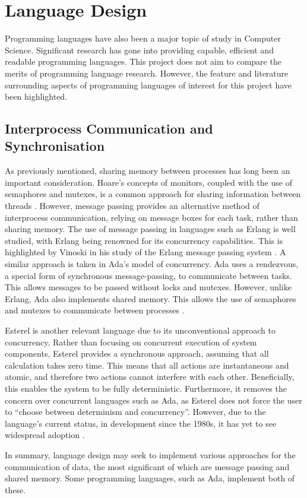 \section{Language Design} 
Programming languages have also been a major topic of study in Computer 
Science. Significant research has gone into providing
capable, efficient and readable programming languages. This project
does not aim to compare the merits of programming language research. However, the
feature and literature surrounding aspects of programming languages of
interest for this project have been highlighted. 

\subsection{Interprocess Communication and Synchronisation} %
As previously mentioned, sharing memory between processes has long been an
important consideration. Hoare's concepts of monitors, coupled with the use of semaphores
and mutexes, is a common approach for sharing information between threads
\cite{Hoare:1974:MOS:355620.361161}.  However, message passing provides an
alternative method of interprocess communication, relying on message boxes for
each task, rather than sharing memory. The use of
message passing in languages such as Erlang is well studied, with
Erlang being renowned for its concurrency capabilities. This is highlighted by
Vinoski in his study of the Erlang message passing system \cite{6216341}. 
A similar approach is taken in Ada's model of
concurrency. Ada uses a rendezvous, a special form of synchronous
message-passing, to communicate between tasks. This allows
messages to be passed without locks and mutexes. However, unlike
Erlang, Ada also implements shared memory. This allows the use of semaphores
and mutexes to communicate between processes
\cite{burns1998concurrency}.  
\par\bigskip\noindent
Esterel is another relevant language due to its unconventional approach to 
concurrency. Rather than focusing on concurrent execution of system components, 
Esterel provides a synchronous approach, assuming that all calculation 
takes zero time. This means that all actions are instantaneous and atomic, 
and therefore two actions cannot interfere with each other. 
Beneficially, this enables the system to be fully deterministic. 
Furthermore, it removes the concern over concurrent languages such as Ada, 
as Esterel does not force the user to ``choose between determinism and concurrency''.
However, due to the language's current status, in development since the 1980s, 
it has yet to see widespread adoption \cite{esterel}.
\par\bigskip\noindent
In summary, language design
may seek to implement various approaches for the communication of data, 
the most significant of which are message passing and shared memory. 
Some programming languages, such as Ada, implement both of these.

